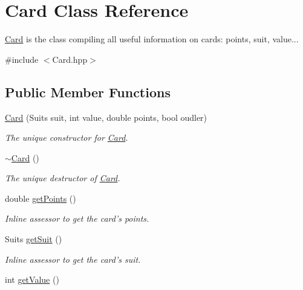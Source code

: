 \hypertarget{classCard}{\section{\-Card \-Class \-Reference}
\label{classCard}
}


\hyperlink{classCard}{\-Card} is the class compiling all useful information on cards\-: points, suit, value...  




{\ttfamily \#include $<$\-Card.\-hpp$>$}

\subsection*{\-Public \-Member \-Functions}
\begin{DoxyCompactItemize}
\item 
\hyperlink{classCard_aecb55d926669ff89cac3e1e58cf76b2b}{\-Card} (\-Suits suit, int value, double points, bool oudler)
\begin{DoxyCompactList}\small\item\em \-The unique constructor for \hyperlink{classCard}{\-Card}. \end{DoxyCompactList}\item 
\hypertarget{classCard_a4e05b0b68e43e5e76c6194458cee874f}{\hyperlink{classCard_a4e05b0b68e43e5e76c6194458cee874f}{$\sim$\-Card} ()}\label{classCard_a4e05b0b68e43e5e76c6194458cee874f}

\begin{DoxyCompactList}\small\item\em \-The unique destructor of \hyperlink{classCard}{\-Card}. \end{DoxyCompactList}\item 
\hypertarget{classCard_a578753a12aa969121f98e890b710b27f}{double \hyperlink{classCard_a578753a12aa969121f98e890b710b27f}{get\-Points} ()}\label{classCard_a578753a12aa969121f98e890b710b27f}

\begin{DoxyCompactList}\small\item\em \-Inline assessor to get the card's points. \end{DoxyCompactList}\item 
\hypertarget{classCard_a6f5c7500047e8b54803b55cf84444190}{\-Suits \hyperlink{classCard_a6f5c7500047e8b54803b55cf84444190}{get\-Suit} ()}\label{classCard_a6f5c7500047e8b54803b55cf84444190}

\begin{DoxyCompactList}\small\item\em \-Inline assessor to get the card's suit. \end{DoxyCompactList}\item 
\hypertarget{classCard_a3df85ce283a6e38b719ffe25f3d4610a}{int \hyperlink{classCard_a3df85ce283a6e38b719ffe25f3d4610a}{get\-Value} ()}\label{classCard_a3df85ce283a6e38b719ffe25f3d4610a}


\end{DoxyCompactItemize}
